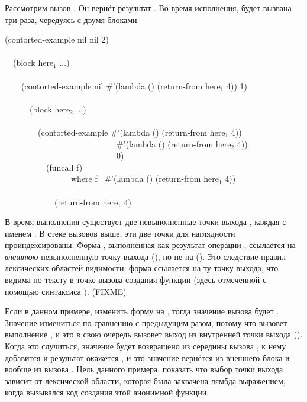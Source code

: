 Рассмотрим вызов . Он вернёт результат
. Во время исполнения,  будет вызвана три раза,
чередуясь с двумя блоками:

\begin{lisp}
(contorted-example nil nil 2) \\
 \\
~~(block here${}_1$ ...) \\
 \\
~~~~(contorted-example nil \#'(lambda () (return-from here${}_1$ 4)) 1) \\
 \\
~~~~~~(block here${}_2$ ...) \\
 \\
~~~~~~~~(contorted-example \#'(lambda () (return-from here${}_1$ 4)) \\
~~~~~~~~~~~~~~~~~~~~~~~~~~~\#'(lambda () (return-from here${}_2$ 4)) \\
~~~~~~~~~~~~~~~~~~~~~~~~~~~0) \\
~~~~~~~~~~(funcall f) \\
~~~~~~~~~~~~~~~~\textrm{where} f \EV\ \#'(lambda () (return-from here${}_1$ 4)) \\
 \\
~~~~~~~~~~~~(return-from here${}_1$ 4)
\end{lisp}

В время выполнения  существует две невыполненные точки выхода
, каждая с именем . В стеке вызовов выше, эти две точки
для наглядности проиндексированы.
Форма , выполненная как результат операции ,
ссылается на \emph{внешнюю} невыполненную точку выхода (), но не
на ().
Это следствие правил лексических областей видимости: форма ссылается на ту точку
выхода, что видима по тексту в точке вызова создания функции
(здесь отмеченной с помощью синтаксиса ). (FIXME)

Если в данном примере, изменить форму  на ,
тогда значение вызова  будет . Значение
измениться по сравнению с предыдущим разом, потому что  вызовет
выполнение , и это в свою очередь вызовет выход
из внутренней точки выхода ().
Когда это случиться, значение  будет возвращено из середины вызова
, к нему добавится  и результат окажется , и это
значение вернётся из внешнего блока и вообще из вызова
. Цель данного примера, показать что выбор точки выхода
зависит от лексической области, которая была 
захвачена лямбда-выражением, когда вызывался код создания этой анонимной функции.

